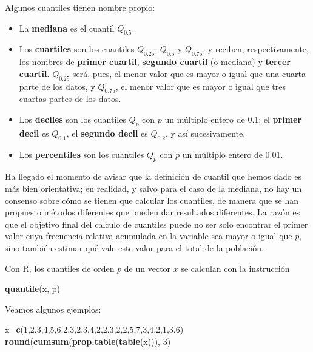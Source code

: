 \documentclass[]{book}
\newenvironment{Shaded}{\begin{snugshade}}{\end{snugshade}}
\newcommand{\DecValTok}[1]{\textcolor[rgb]{0.00,0.00,0.81}{#1}}
\newcommand{\KeywordTok}[1]{\textcolor[rgb]{0.13,0.29,0.53}{\textbf{#1}}}
\newcommand{\NormalTok}[1]{#1}
\theoremstyle{definition}
\theoremstyle{definition}
\theoremstyle{definition}
\theoremstyle{remark}
\begin{document}
Algunos cuantiles tienen nombre propio:

\begin{itemize}
\item
  La \textbf{mediana} es el cuantil \(Q_{0.5}\).
\item
  Los \textbf{cuartiles} son los cuantiles \(Q_{0.25}\), \(Q_{0.5}\) y \(Q_{0.75}\), y reciben, respectivamente, los nombres de \textbf{primer cuartil}, \textbf{segundo cuartil} (o mediana) y \textbf{tercer cuartil}. \(Q_{0.25}\) será, pues, el menor valor que es mayor o igual que una cuarta parte de los datos, y \(Q_{0.75}\), el menor valor que es mayor o igual que tres cuartas partes de los datos.
\item
  Los \textbf{deciles} son los cuantiles \(Q_{p}\) con \(p\) un múltiplo entero de 0.1: el \textbf{primer decil} es \(Q_{0.1}\), el \textbf{segundo decil} es \(Q_{0.2}\), y así sucesivamente.
\item
  Los \textbf{percentiles} son los cuantiles \(Q_{p}\) con \(p\) un múltiplo entero de 0.01.
\end{itemize}

Ha llegado el momento de avisar que la definición de cuantil que hemos dado es más bien orientativa; en realidad, y salvo para el caso de la mediana, no hay un consenso sobre cómo se tienen que calcular los cuantiles, de manera que se han propuesto métodos diferentes que pueden dar resultados diferentes. La razón es que el objetivo final del cálculo de cuantiles puede no ser solo encontrar el primer valor cuya frecuencia relativa acumulada en la variable sea mayor o igual que \(p\), sino también estimar qué vale este valor para el total de la población.

Con R, los cuantiles de orden \(p\) de un vector \(x\) se calculan con la instrucción

\begin{Shaded}
\begin{Highlighting}[]
\KeywordTok{quantile}\NormalTok{(x, p)}
\end{Highlighting}
\end{Shaded}

Veamos algunos ejemplos:

\begin{Shaded}
\begin{Highlighting}[]
\NormalTok{x=}\KeywordTok{c}\NormalTok{(}\DecValTok{1}\NormalTok{,}\DecValTok{2}\NormalTok{,}\DecValTok{3}\NormalTok{,}\DecValTok{4}\NormalTok{,}\DecValTok{5}\NormalTok{,}\DecValTok{6}\NormalTok{,}\DecValTok{2}\NormalTok{,}\DecValTok{3}\NormalTok{,}\DecValTok{2}\NormalTok{,}\DecValTok{3}\NormalTok{,}\DecValTok{4}\NormalTok{,}\DecValTok{2}\NormalTok{,}\DecValTok{2}\NormalTok{,}\DecValTok{3}\NormalTok{,}\DecValTok{2}\NormalTok{,}\DecValTok{2}\NormalTok{,}\DecValTok{5}\NormalTok{,}\DecValTok{7}\NormalTok{,}\DecValTok{3}\NormalTok{,}\DecValTok{4}\NormalTok{,}\DecValTok{2}\NormalTok{,}\DecValTok{1}\NormalTok{,}\DecValTok{3}\NormalTok{,}\DecValTok{6}\NormalTok{)}
\KeywordTok{round}\NormalTok{(}\KeywordTok{cumsum}\NormalTok{(}\KeywordTok{prop.table}\NormalTok{(}\KeywordTok{table}\NormalTok{(x))), }\DecValTok{3}\NormalTok{)}
\end{Highlighting}
\end{Shaded}
\end{document}
